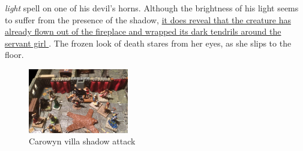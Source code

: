 {\itshape light} spell on one of his devil's horns. Although the brightness of his light seems to suffer from the presence of the shadow, \hyperref[fig:Carowyn-villa-shadow-attack-486296086]{ it does reveal that the creature has already flown out of the fireplace and wrapped its dark tendrils around the servant girl } . The frozen look of death stares from her eyes, as she slips to the floor. \\

\begin{figure}[h]
	\centering
	\includegraphics[width=0.39\textwidth]{images/Carowyn-villa-shadow-attack-486296086.jpg}
	\caption{Carowyn villa shadow attack}
	\label{fig:Carowyn-villa-shadow-attack-486296086}
\end{figure}

